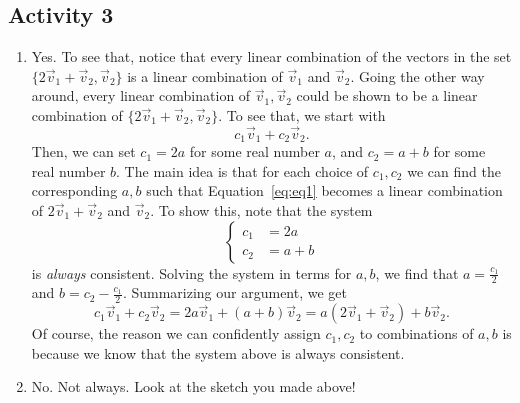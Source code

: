 \subsection{Activity 3}
\begin{enumerate}
	\item Yes. To see that, notice that every linear combination of the vectors in the set \(\{2\vec{v}_1 + \vec{v}_2, \vec{v}_2\}\) is a linear combination
		of \(\vec{v}_1\) and \(\vec{v}_2\). Going the other way around, every linear combination of \(\vec{v}_1, \vec{v}_2\) could be shown to be a linear
		combination of \(\{2\vec{v}_1 + \vec{v}_2, \vec{v}_2\}\). To see that, we start with 
			\begin{equation} \label{eq:eq1}
				c_1\vec{v}_1 + c_2\vec{v}_2.
			\end{equation}
		Then, we can set \(c_1 = 2a\) for some real number \(a\), and \(c_2 = a + b\) for some real number \(b\). The main idea is that for each choice of 
		\(c_1, c_2\) we can find the corresponding \(a, b\) such that Equation~\ref{eq:eq1} becomes a linear combination of \(2\vec{v}_1 + \vec{v}_2\) and 
		\(\vec{v}_2\). To show this, note that the system
		\[\left\{\begin{aligned}
			 c_1 &= 2a \\
			 c_2 &= a + b
		\end{aligned}\right.\]
		is \emph{always} consistent. Solving the system in terms for \(a, b\), we find that \(a = \frac{c_1}{2}\) and \(b = c_2 - \frac{c_1}{2}.\) 
		Summarizing our argument, we get 
		\[c_1\vec{v}_1 + c_2\vec{v}_2 = 2a\vec{v}_1 + (a + b)\vec{v}_2 = a (2\vec{v}_1 + \vec{v}_2) + b\vec{v}_2.\] 
		Of course, the reason we can confidently assign \(c_1, c_2\) to combinations of \(a, b\) is because we know that the system above is always 
		consistent.

	\item No. Not always. Look at the sketch you made above!
\end{enumerate}

